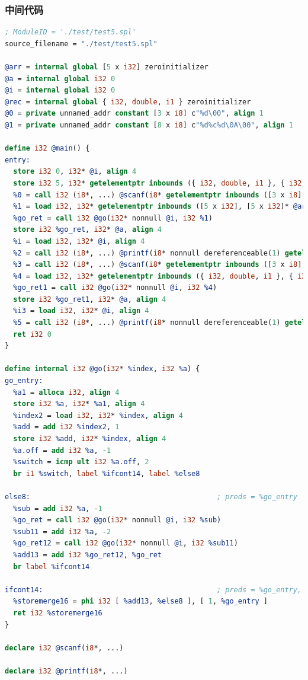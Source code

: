 \documentclass{article}
\begin{document}
\subsubsection{中间代码}
\begin{lstlisting}[language=LLVM]
; ModuleID = './test/test5.spl'
source_filename = "./test/test5.spl"

@arr = internal global [5 x i32] zeroinitializer
@a = internal global i32 0
@i = internal global i32 0
@rec = internal global { i32, double, i1 } zeroinitializer
@0 = private unnamed_addr constant [3 x i8] c"%d\00", align 1
@1 = private unnamed_addr constant [8 x i8] c"%d%c%d\0A\00", align 1

define i32 @main() {
entry:
  store i32 0, i32* @i, align 4
  store i32 5, i32* getelementptr inbounds ({ i32, double, i1 }, { i32, double, i1 }* @rec, i64 0, i32 0), align 16
  %0 = call i32 (i8*, ...) @scanf(i8* getelementptr inbounds ([3 x i8], [3 x i8]* @0, i64 0, i64 0), i32* getelementptr inbounds ([5 x i32], [5 x i32]* @arr, i64 0, i64 1))
  %1 = load i32, i32* getelementptr inbounds ([5 x i32], [5 x i32]* @arr, i64 0, i64 1), align 4
  %go_ret = call i32 @go(i32* nonnull @i, i32 %1)
  store i32 %go_ret, i32* @a, align 4
  %i = load i32, i32* @i, align 4
  %2 = call i32 (i8*, ...) @printf(i8* nonnull dereferenceable(1) getelementptr inbounds ([8 x i8], [8 x i8]* @1, i64 0, i64 0), i32 %go_ret, i8 32, i32 %i)
  %3 = call i32 (i8*, ...) @scanf(i8* getelementptr inbounds ([3 x i8], [3 x i8]* @0, i64 0, i64 0), i32* getelementptr inbounds ({ i32, double, i1 }, { i32, double, i1 }* @rec, i64 0, i32 0))
  %4 = load i32, i32* getelementptr inbounds ({ i32, double, i1 }, { i32, double, i1 }* @rec, i64 0, i32 0), align 16
  %go_ret1 = call i32 @go(i32* nonnull @i, i32 %4)
  store i32 %go_ret1, i32* @a, align 4
  %i3 = load i32, i32* @i, align 4
  %5 = call i32 (i8*, ...) @printf(i8* nonnull dereferenceable(1) getelementptr inbounds ([8 x i8], [8 x i8]* @1, i64 0, i64 0), i32 %go_ret1, i8 32, i32 %i3)
  ret i32 0
}

define internal i32 @go(i32* %index, i32 %a) {
go_entry:
  %a1 = alloca i32, align 4
  store i32 %a, i32* %a1, align 4
  %index2 = load i32, i32* %index, align 4
  %add = add i32 %index2, 1
  store i32 %add, i32* %index, align 4
  %a.off = add i32 %a, -1
  %switch = icmp ult i32 %a.off, 2
  br i1 %switch, label %ifcont14, label %else8

else8:                                            ; preds = %go_entry
  %sub = add i32 %a, -1
  %go_ret = call i32 @go(i32* nonnull @i, i32 %sub)
  %sub11 = add i32 %a, -2
  %go_ret12 = call i32 @go(i32* nonnull @i, i32 %sub11)
  %add13 = add i32 %go_ret12, %go_ret
  br label %ifcont14

ifcont14:                                         ; preds = %go_entry, %else8
  %storemerge16 = phi i32 [ %add13, %else8 ], [ 1, %go_entry ]
  ret i32 %storemerge16
}

declare i32 @scanf(i8*, ...)

declare i32 @printf(i8*, ...)
\end{lstlisting}
\end{document}
